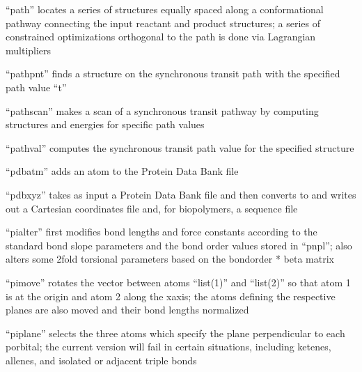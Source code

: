 \documentclass[letterpaper,11pt,english]{sphinxmanual}
\begin{document}


“path” locates a series of structures equally spaced along a conformational pathway connecting the input reactant and product structures; a series of constrained optimizations orthogonal to the path is done via Lagrangian multipliers



“pathpnt” finds a structure on the synchronous transit path with the specified path value “t”


“pathscan” makes a scan of a synchronous transit pathway by computing structures and energies for specific path values


“pathval” computes the synchronous transit path value for the specified structure


“pdbatm” adds an atom to the Protein Data Bank file


“pdbxyz” takes as input a Protein Data Bank file and then converts to and writes out a Cartesian coordinates file and, for biopolymers, a sequence file


“pialter” first modifies bond lengths and force constants according to the standard bond slope parameters and the bond order values stored in “pnpl”; also alters some 2\sphinxhyphen{}fold torsional parameters based on the bond\sphinxhyphen{}order * beta matrix


“pimove” rotates the vector between atoms “list(1)” and “list(2)” so that atom 1 is at the origin and atom 2 along the x\sphinxhyphen{}axis; the atoms defining the respective planes are also moved and their bond lengths normalized


“piplane” selects the three atoms which specify the plane perpendicular to each p\sphinxhyphen{}orbital; the current version will fail in certain situations, including ketenes, allenes, and isolated or adjacent triple bonds
\end{document}
